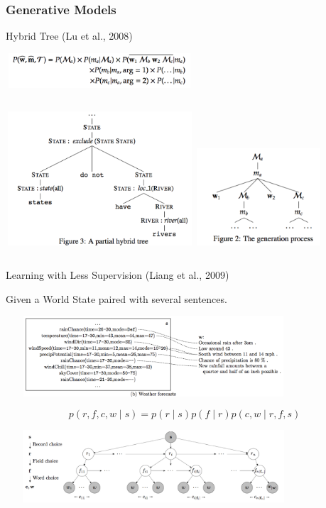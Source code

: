 \documentclass{beamer}
\begin{document}
\begin{frame}
    \frametitle{Generative Models}

     {
        Hybrid Tree (Lu et al., 2008)

        \includegraphics[width=7cm,height=1.3cm]{img/hybrid-tree-model.png}

        \begin{columns}

            \includegraphics[width=7cm,height=5cm]{img/hybrid-tree-sample.png}
            \includegraphics[width=4.6cm,height=3.6cm]{img/hybrid-tree-generation.png}
        \end{columns}
    }

     {
        Learning with Less Supervision (Liang et al., 2009)

        Given a World State paired with several sentences.
        \begin{center}
            \includegraphics[width=11cm,height=3.0cm]{img/weather-report.png}
        \end{center}
        \[
            p(r, f, c, w \mid s) = p(r \mid s)p(f \mid r)p(c, w \mid r, f, s)
        \]
        \begin{center}
            \includegraphics[width=11cm,height=2.7cm]{img/world-state-model.png}
        \end{center}
    }

\end{frame}
\end{document}
